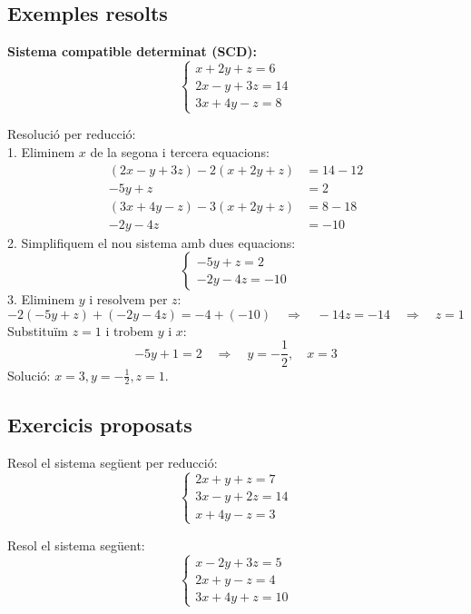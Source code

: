 \documentclass[12pt]{article}
\begin{document}
\subsection*{Exemples resolts}
\begin{exemple}
\textbf{Sistema compatible determinat (SCD):}
\[
\begin{cases}
x + 2y + z = 6 \\
2x - y + 3z = 14 \\
3x + 4y - z = 8
\end{cases}
\]

\end{exemple}

\begin{exemple}
Resolució per reducció:\\

1. Eliminem \(x\) de la segona i tercera equacions:
\[
\begin{aligned}
(2x - y + 3z) - 2(x + 2y + z) &= 14 - 12 \\
-5y + z &= 2 \\
(3x + 4y - z) - 3(x + 2y + z) &= 8 - 18 \\
-2y - 4z &= -10
\end{aligned}
\]
2. Simplifiquem el nou sistema amb dues equacions:
\[
\begin{cases}
-5y + z = 2 \\
-2y - 4z = -10
\end{cases}
\]
3. Eliminem \(y\) i resolvem per \(z\):
\[
-2(-5y + z) + (-2y - 4z) = -4 + (-10) \quad \Rightarrow \quad -14z = -14 \quad \Rightarrow \quad z = 1
\]
Substituïm \(z = 1\) i trobem \(y\) i \(x\):
\[
-5y + 1 = 2 \quad \Rightarrow \quad y = -\frac{1}{2}, \quad x = 3
\]
Solució: \(x = 3, y = -\frac{1}{2}, z = 1\).
\end{exemple}

\subsection*{Exercicis proposats}
\begin{exercici}
Resol el sistema següent per reducció:
\[
\begin{cases}
2x + y + z = 7 \\
3x - y + 2z = 14 \\
x + 4y - z = 3
\end{cases}
\]
\end{exercici}

\begin{exercici}
Resol el sistema següent:
\[
\begin{cases}
x - 2y + 3z = 5 \\
2x + y - z = 4 \\
3x + 4y + z = 10
\end{cases}
\]
\end{exercici}
\end{document}
